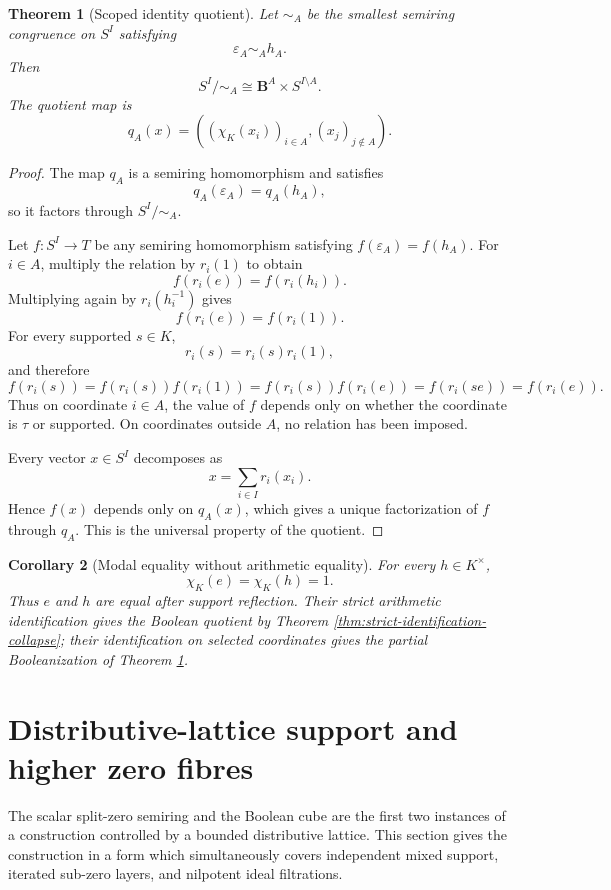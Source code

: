 \documentclass[11pt]{amsart}
\numberwithin{equation}{section}
\newtheorem{theorem}{Theorem}[section]
\newtheorem{corollary}[theorem]{Corollary}
\theoremstyle{definition}
\newcommand{\B}{\mathbf B}
\newcommand{\eps}{\varepsilon}
\begin{document}
\begin{theorem}[Scoped identity quotient]\label{thm:scoped-identity}
Let $\sim_A$ be the smallest semiring congruence on $S^I$ satisfying
\[
\eps_A\sim_A h_A.
\]
Then
\[
S^I/{\sim_A}
\cong
\B^A\times S^{I\setminus A}.
\]
The quotient map is
\[
q_A(x)
=
\left(
(\chi_K(x_i))_{i\in A},
(x_j)_{j\notin A}
\right).
\]
\end{theorem}

\begin{proof}
The map $q_A$ is a semiring homomorphism and satisfies
\[
q_A(\eps_A)=q_A(h_A),
\]
so it factors through $S^I/{\sim_A}$.

Let $f:S^I\to T$ be any semiring homomorphism satisfying $f(\eps_A)=f(h_A)$.  For $i\in A$, multiply the relation by $r_i(1)$ to obtain
\[
f(r_i(e))=f(r_i(h_i)).
\]
Multiplying again by $r_i(h_i^{-1})$ gives
\[
f(r_i(e))=f(r_i(1)).
\]
For every supported $s\in K$,
\[
r_i(s)=r_i(s)r_i(1),
\]
and therefore
\[
f(r_i(s))
=f(r_i(s))f(r_i(1))
=f(r_i(s))f(r_i(e))
=f(r_i(se))
=f(r_i(e)).
\]
Thus on coordinate $i\in A$, the value of $f$ depends only on whether the coordinate is $\tau$ or supported.  On coordinates outside $A$, no relation has been imposed.

Every vector $x\in S^I$ decomposes as
\[
x=\sum_{i\in I}r_i(x_i).
\]
Hence $f(x)$ depends only on $q_A(x)$, which gives a unique factorization of $f$ through $q_A$.  This is the universal property of the quotient.
\end{proof}

\begin{corollary}[Modal equality without arithmetic equality]\label{cor:modal-equality}
For every $h\in K^\times$,
\[
\chi_K(e)=\chi_K(h)=1.
\]
Thus $e$ and $h$ are equal after support reflection.  Their strict arithmetic identification gives the Boolean quotient by Theorem \ref{thm:strict-identification-collapse}; their identification on selected coordinates gives the partial Booleanization of Theorem \ref{thm:scoped-identity}.
\end{corollary}


\section{Distributive-lattice support and higher zero fibres}
\label{sec:lattice-support}

The scalar split-zero semiring and the Boolean cube are the first two
instances of a construction controlled by a bounded distributive lattice.
This section gives the construction in a form which simultaneously covers
independent mixed support, iterated sub-zero layers, and nilpotent ideal
filtrations.
\end{document}
